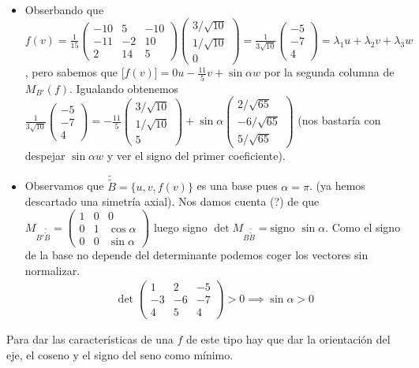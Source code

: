 \documentclass[14pt]{book}
\begin{document}
\begin{ej}
\begin{itemize}
		\item Obserbando que $f(v) = \frac{1}{15}\left(\begin{array}{ccc}
		-10 & 5 & -10 \\ -11 & -2 & 10 \\ 2 & 14 & 5
		\end{array}\right)\left(\begin{array}{c}
		3/\sqrt{10} \\ 1/\sqrt{10} \\ 0
		\end{array}\right) = \frac{1}{3\sqrt{10}}\left(\begin{array}{c}
		-5 \\ -7 \\ 4
		\end{array}\right) = \lambda_1 u + \lambda_2 v + \lambda_3 w$, pero sabemos que [$f(v)] = 0 u - \frac{11}{5} v + \sin \alpha w$ por la segunda columna de $M_{B'}(f)$. Igualando obtenemos $\frac{1}{3\sqrt{10}}\left(\begin{array}{c}
		-5 \\ -7 \\ 4
		\end{array}\right) = -\frac{11}{5}\left(\begin{array}{c}
		3/\sqrt{10} \\ 1/\sqrt{10} \\ 5
		\end{array}\right) + \sin \alpha \left(\begin{array}{c}
		2/\sqrt{65} \\ -6 / \sqrt{65} \\ 5 / \sqrt{65}
		\end{array}\right)$ (nos bastaría con despejar $\sin \alpha w$ y ver el signo del primer coeficiente).
		\item Observamos que $\tilde{\tilde{B}} = \{u, v, f(v)\}$ es una base pues $\alpha = \pi$. (ya hemos descartado una simetría axial). Nos damos cuenta (?) de que $M_{B' \tilde{\tilde{B}}} = \left(\begin{array}{ccc}
		1 & 0 & 0 \\ 0 & 1 & \cos \alpha \\ 0 & 0 & \sin \alpha
		\end{array}\right)$ luego signo $\det M_{B \tilde{\tilde{B}}} = \text{signo }\sin \alpha$. Como el signo de la base no depende del determinante podemos coger los vectores sin normalizar.
		\begin{align*}
			\det \left(\begin{array}{ccc}
			1 & 2 & -5 \\ -3 & -6 & -7 \\ 4 & 5 & 4
			\end{array}\right) > 0 \implies \sin \alpha > 0
		\end{align*}
	\end{itemize}

	Para dar las características de una $f$ de este tipo hay que dar la orientación del eje, el coseno y el signo del seno como mínimo.
\end{ej}
\end{document}
